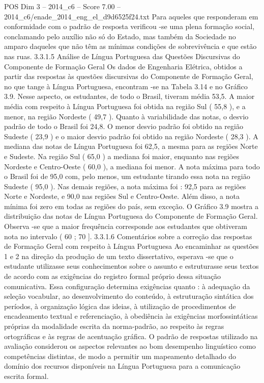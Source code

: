 \begin{textsample}{POS Dim 3 – 2014\_c6 – Score 7.00 – 2014\_c6/enade\_2014\_eng\_el\_d9d6525f24.txt}
Para aqueles que responderam em conformidade com o padrão de resposta verificou -se uma plena formação social, conclamando pelo auxílio não só do Estado, mas também da Sociedade no amparo daqueles que não têm as mínimas condições de sobrevivência e que estão nas ruas. 3.3.1.5 Análise de Língua Portuguesa das Questões Discursivas do Componente de Formação Geral Os dados de Engenharia Elétrica, obtidos a partir das respostas às questões discursivas do Componente de Formação Geral, no que tange à Língua Portuguesa, encontram -se na Tabela 3.14 e no Gráfico 3.9.
Nesse aspecto, os estudantes, de todo o Brasil, tiveram média 53,5.
A maior média com respeito à Língua Portuguesa foi obtida na região Sul ( 55,8 ), e a menor, na região Nordeste ( 49,7 ).
Quanto à variabilidade das notas, o desvio padrão de todo o Brasil foi 24,8.
O menor desvio padrão foi obtido na região Sudeste ( 23,9 ) e o maior desvio padrão foi obtido na região Nordeste ( 28,3 ).
A mediana das notas de Língua Portuguesa foi 62,5, a mesma para as regiões Norte e Sudeste.
Na região Sul ( 65,0 ) a mediana foi maior, enquanto nas regiões Nordeste e Centro-Oeste ( 60,0 ), a mediana foi menor.
A nota máxima para todo o Brasil foi de 95,0 com, pelo menos, um estudante tirando essa nota na região Sudeste ( 95,0 ).
Nas demais regiões, a nota máxima foi : 92,5 para as regiões Norte e Nordeste, e 90,0 nas regiões Sul e Centro-Oeste.
Além disso, a nota mínima foi zero em todas as regiões do país, sem exceção.
O Gráfico 3.9 mostra a distribuição das notas de Língua Portuguesa do Componente de Formação Geral.
Observa -se que a maior frequência corresponde aos estudantes que obtiveram nota no intervalo ( 60 ; 70 ]. 3.3.1.6 Comentários sobre a correção das respostas de Formação Geral com respeito à Língua Portuguesa Ao encaminhar as questões 1 e 2 na direção da produção de um texto dissertativo, esperava -se que o estudante utilizasse seus conhecimentos sobre o assunto e estruturasse seus textos de acordo com as exigências do registro formal próprio dessa situação comunicativa.
Essa configuração determina exigências quanto : à adequação da seleção vocabular, ao desenvolvimento do conteúdo, à estruturação sintática dos períodos, à organização lógica das ideias, à utilização de procedimentos de encadeamento textual e referenciação, à obediência às exigências morfossintáticas próprias da modalidade escrita da norma-padrão, ao respeito às regras ortográficas e às regras de acentuação gráfica.
O padrão de respostas utilizado na avaliação considerou os aspectos relevantes ao bom desempenho linguístico como competências distintas, de modo a permitir um mapeamento detalhado do domínio dos recursos disponíveis na Língua Portuguesa para a comunicação escrita formal.

\end{textsample}
